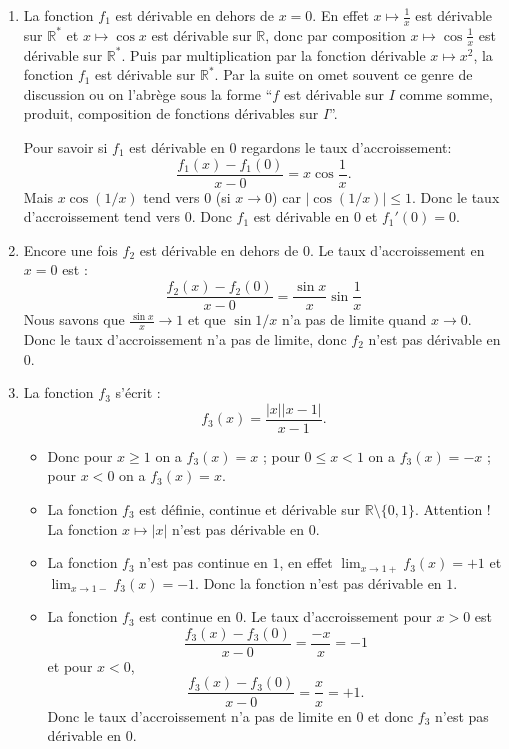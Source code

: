 \documentclass[11pt,a4paper]{article}
\newcommand{\Rr}{\mathbb{R}} \newcommand{\R}{\mathbb{R}}
\begin{document}
\begin{enumerate}
  \item La fonction $f_1$ est d\'erivable en dehors de $x=0$.
En effet $x \mapsto \frac 1x$ est dérivable sur $\Rr^*$ et $x \mapsto \cos x$ est dérivable sur $\Rr$,
donc par composition $x \mapsto  \cos \frac 1x$ est dérivable sur $\Rr^*$. Puis par multiplication par la fonction dérivable 
$x \mapsto x^2$, la fonction $f_1$ est dérivable sur $\Rr^*$. 
Par la suite on omet souvent ce genre de discussion ou on l'abrège sous la forme ``$f$ est dérivable sur $I$ comme somme, produit,
composition de fonctions dérivables sur $I$''.

Pour savoir si $f_1$ est d\'erivable en $0$ regardons le taux d'accroissement:
$$ \frac{f_1(x)-f_1(0)}{x-0}= x\cos \frac 1 x.$$
Mais $x \cos (1/x)$ tend vers $0$ (si $x\rightarrow 0$) car
$|\cos (1/x)| \leq 1$.
Donc le taux d'accroissement tend vers $0$. Donc $f_1$ est d\'erivable en $0$ et $f_1'(0)=0$.
  \item Encore une fois $f_2$ est d\'erivable en dehors de $0$.
Le taux d'accroissement en $x=0$ est :
$$ \frac{f_2(x)-f_2(0)}{x-0}= \frac{\sin x}{x} \sin \frac 1 x$$
Nous savons que $\frac{\sin x}{x} \rightarrow 1$ et que
$\sin 1/x$ n'a pas de limite quand $x\rightarrow 0$. Donc le taux d'accroissement n'a pas de limite, donc $f_2$ n'est pas d\'erivable en $0$.
  \item 
La fonction $f_3$ s'\'ecrit :
$$f_3(x) = \frac{|x||x-1|}{x-1}.$$
\begin{itemize}
  \item
  Donc pour $x \geq 1$ on a $f_3(x) = x$ ;
pour $0 \leq x < 1$ on a $f_3(x) = -x$ ;
pour $x <0$ on a $f_3(x) = x$.

\item La fonction $f_3$ est d\'efinie, continue et d\'erivable sur 
$\Rr \setminus \{0,1\}$. Attention ! La fonction $x \mapsto |x|$ n'est pas dérivable en $0$.

\item 
La fonction $f_3$ n'est pas continue en $1$, en effet
$\lim_{x \rightarrow 1+} f_3(x) = +1$ et  $\lim_{x \rightarrow 1-} f_3(x) = -1$. Donc la fonction n'est pas d\'erivable en $1$.

\item
La fonction $f_3$ est continue en $0$. 
Le taux d'accroissement pour $x>0$ est 
$$\frac{f_3(x)-f_3(0)}{x-0}= \frac{-x}{x} = -1$$
et pour $x <0$, 
$$\frac{f_3(x)-f_3(0)}{x-0}= \frac{x}{x} = +1.$$
Donc le taux d'accroissement n'a pas de limite en $0$ et donc $f_3$ n'est pas d\'erivable en $0$.
\end{itemize}
\end{enumerate}
\end{document}
